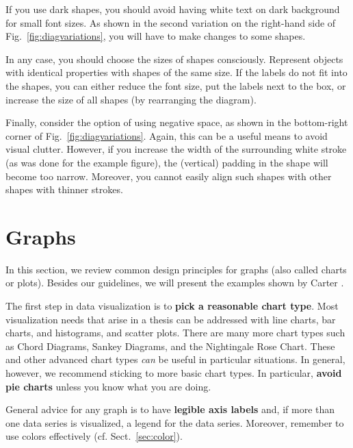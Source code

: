 If you use dark shapes, you should avoid having white text on dark background for small font sizes. As shown in the second variation on the right-hand side of Fig.~\ref{fig:diagvariations}, you will have to make changes to some shapes.

In any case, you should choose the sizes of shapes consciously. Represent objects with identical properties with shapes of the same size. If the labels do not fit into the shapes, you can either reduce the font size, put the labels next to the box, or increase the size of all shapes (by rearranging the diagram).

Finally, consider the option of using negative space, as shown in the bottom-right corner of Fig.~\ref{fig:diagvariations}. Again, this can be a useful means to avoid visual clutter. However, if you increase the width of the surrounding white stroke (as was done for the example figure), the (vertical) padding in the shape will become too narrow. Moreover, you cannot easily align such shapes with other shapes with thinner strokes.


\section{Graphs}

In this section, we review common design principles for graphs (also called charts or plots). Besides our guidelines, we will present the examples shown by Carter \cite{Carter12}.

The first step in data visualization is to \textbf{pick a reasonable chart type}. Most visualization needs that arise in a thesis can be addressed with line charts, bar charts, and histograms, and scatter plots. There are many more chart types such as Chord Diagrams, Sankey Diagrams, and the Nightingale Rose Chart.
These and other advanced chart types \emph{can} be useful in particular situations. In general, however, we recommend sticking to more basic chart types. In particular, \textbf{avoid pie charts} unless you know what you are doing.

General advice for any graph is to have \textbf{legible axis labels} and, if more than one data series is visualized, a legend for the data series. Moreover, remember to use colors effectively (cf. Sect.~\ref{sec:color}).

